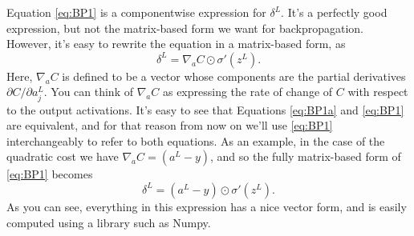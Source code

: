 \documentclass[a4paper,twoside,10pt]{book}
\begin{document}
Equation \ref{eq:BP1} is a componentwise expression for $\delta^L$. It's a perfectly good expression, but not the matrix-based form we want for backpropagation. However, it's easy to rewrite the equation in a matrix-based form, as
\begin{equation}
\delta^L = \nabla_a C \odot \sigma'(z^L).
\tag{BP1a}
\label{eq:BP1a}
\end{equation}
Here, $\nabla_a C$ is defined to be a vector whose components are the partial derivatives $\partial{}C/\partial{}a^L_j$. You can think of $\nabla_a C$ as expressing the rate of change of $C$ with respect to the output activations. It's easy to see that Equations \ref{eq:BP1a} and \ref{eq:BP1} are equivalent, and for that reason from now on we'll use \ref{eq:BP1} interchangeably to refer to both equations. As an example, in the case of the quadratic cost we have $\nabla_a C =(a^L-y)$, and so the fully matrix-based form of \ref{eq:BP1} becomes
\begin{equation}
\delta^L = (a^L-y) \odot \sigma'(z^L).
\tag{30}
\label{eq:30}
\end{equation}
As you can see, everything in this expression has a nice vector form, and is easily computed using a library such as Numpy.
%
%
%
\end{document}

